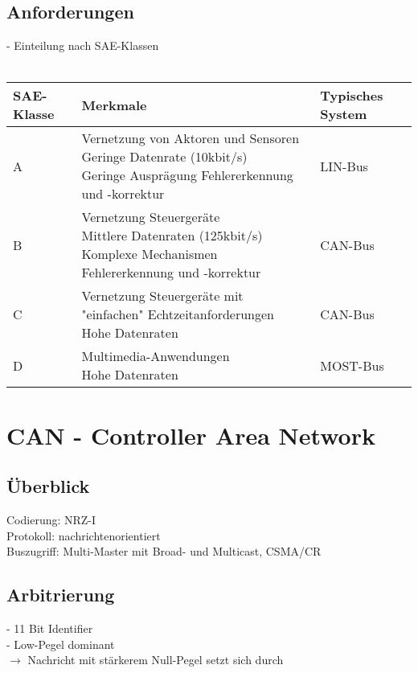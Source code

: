 \documentclass{article}
\newcommand{\follows}{$\rightarrow$ }
\begin{document}
	\subsection{Anforderungen}
	- Einteilung nach SAE-Klassen \\ \\
	\begin{tabular}{l | l | l}
		SAE-Klasse & Merkmale & Typisches System \\ \hline
		A & \parbox[t]{7cm}{Vernetzung von Aktoren und Sensoren \\
			Geringe Datenrate (10kbit/s) \\
			Geringe Ausprägung Fehlererkennung und -korrektur} & LIN-Bus \\ \hline
		B & \parbox[t]{7cm}{Vernetzung Steuergeräte \\
			Mittlere Datenraten (125kbit/s) \\
			Komplexe Mechanismen Fehlererkennung und -korrektur} & CAN-Bus \\ \hline
		C & \parbox[t]{7cm}{Vernetzung Steuergeräte mit "einfachen" Echtzeitanforderungen \\
			Hohe Datenraten} & CAN-Bus \\ \hline
		D & \parbox[t]{7cm}{Multimedia-Anwendungen \\
			Hohe Datenraten} & MOST-Bus\\
	\end{tabular}
	
	\section{CAN - Controller Area Network}
	\subsection{Überblick}
	Codierung: NRZ-I \\
	Protokoll: nachrichtenorientiert \\
	Buszugriff: Multi-Master mit Broad- und Multicast, CSMA/CR
	
	\subsection{Arbitrierung}
	- 11 Bit Identifier \\
	- Low-Pegel dominant \\
	\follows Nachricht mit stärkerem Null-Pegel setzt sich durch
	
\end{document}

